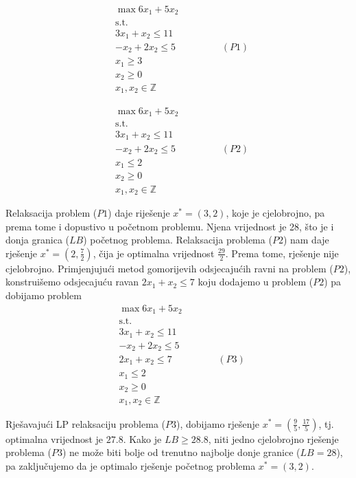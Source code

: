 \documentclass[a4paper, utf8, 11pt, colorlinks]{book}
\begin{document}
\begin{align*}
    &\max 6 x_1 + 5 x_2 \\
    & \mbox{s.t. } \\
    & 3x_1 + x_2 \leq 11 \\
    & - x_2 + 2 x_2 \leq 5 \hspace{2cm} (P1) \\
    & x_1 \geq 3 \\
    & x_2 \geq 0 \\
    & x_1, x_2 \in \mathbb{Z}
\end{align*}

\begin{align*}
    &\max 6 x_1 + 5 x_2 \\
    & \mbox{s.t. } \\
    & 3x_1 + x_2 \leq 11 \\
    & - x_2 + 2 x_2 \leq 5 \hspace{2cm} (P2) \\
    & x_1  \leq 2 \\
    & x_2 \geq 0 \\
    & x_1, x_2 \in \mathbb{Z}
\end{align*}

Relaksacija problem ($P1$) daje riješenje $x^*=(3,2)$, koje je cjelobrojno, pa prema tome i dopustivo u početnom problemu. Njena vrijednost je 28, što je i donja granica ($LB$) početnog problema. Relaksacija problema ($P2$) nam daje rješenje $x^*=(2, \frac{7}{2})$, čija je optimalna vrijednost $\frac{29}{2}$.  Prema tome, rješenje nije cjelobrojno. Primjenjujući metod gomorijevih odsjecajućih ravni na problem ($P2$), konstruišemo odsjecajuću ravan $2x_1 + x_2 \leq 7$ koju dodajemo u problem ($P2$) pa dobijamo problem 
\begin{align*}
    &\max 6 x_1 + 5 x_2 \\
    & \mbox{s.t. } \\
    & 3x_1 + x_2 \leq 11 \\
    & - x_2 + 2 x_2 \leq 5  \\
    & 2x_1 + x_2 \leq 7 \hspace{2cm} (P3)\\ 
    & x_1  \leq 2 \\
    & x_2 \geq 0 \\
    & x_1, x_2 \in \mathbb{Z}
\end{align*}

Rješavajući LP relaksaciju problema ($P3$), dobijamo rješenje $x^*=(\frac{9}{5}, \frac{17}{5})$, tj.  optimalna vrijednost je $27.8$. Kako je $LB \geq 28.8$, niti jedno cjelobrojno rješenje problema ($P3$) ne može biti bolje od trenutno najbolje donje granice ($LB=28$), pa zaključujemo da je optimalo rješenje početnog problema $x^*=(3,2)$. 
\end{document}
